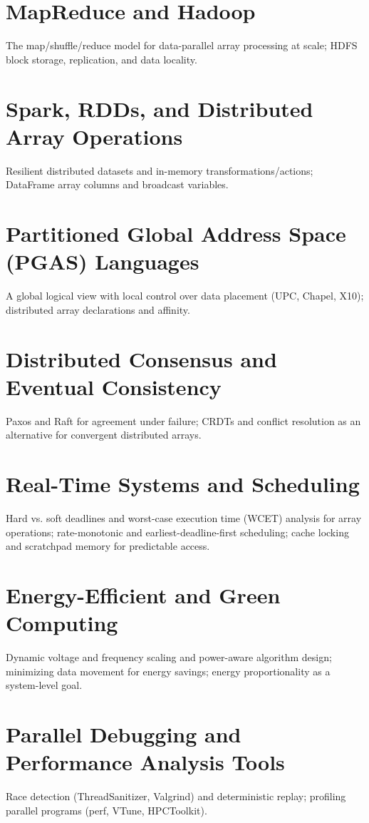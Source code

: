 \chapter{MapReduce and Hadoop}
The map/shuffle/reduce model for data-parallel array processing at scale; HDFS block storage, replication, and data locality.

\chapter{Spark, RDDs, and Distributed Array Operations}
Resilient distributed datasets and in-memory transformations/actions; DataFrame array columns and broadcast variables.

\chapter{Partitioned Global Address Space (PGAS) Languages}
A global logical view with local control over data placement (UPC, Chapel, X10); distributed array declarations and affinity.

\chapter{Distributed Consensus and Eventual Consistency}
Paxos and Raft for agreement under failure; CRDTs and conflict resolution as an alternative for convergent distributed arrays.

\chapter{Real-Time Systems and Scheduling}
Hard vs. soft deadlines and worst-case execution time (WCET) analysis for array operations; rate-monotonic and earliest-deadline-first scheduling; cache locking and scratchpad memory for predictable access.

\chapter{Energy-Efficient and Green Computing}
Dynamic voltage and frequency scaling and power-aware algorithm design; minimizing data movement for energy savings; energy proportionality as a system-level goal.

\chapter{Parallel Debugging and Performance Analysis Tools}
Race detection (ThreadSanitizer, Valgrind) and deterministic replay; profiling parallel programs (perf, VTune, HPCToolkit).

